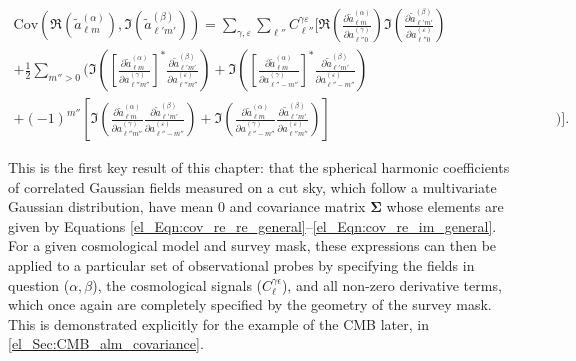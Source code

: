 \begin{equation}
\begin{split}
\mathrm{Cov} \left(
\Re \left( \widetilde{a}_{\ell m}^{ \left( \alpha \right) } \right),
\Im \left( \widetilde{a}_{\ell' m'}^{ \left( \beta \right) } \right)
\right) =
\sum_{\gamma, \varepsilon}
\sum_{\ell''}
C_{\ell''}^{\gamma \varepsilon}
\Bigg[
\Re \left(
\frac{\partial \widetilde{a}_{\ell m}^{ \left( \alpha \right) }}
{\partial a_{\ell'' 0}^{ \left( \gamma \right) }}
\right)
\Im \left(
\frac{\partial \widetilde{a}_{\ell' m'}^{ \left( \beta \right) }}
{\partial a_{\ell'' 0}^{ \left( \varepsilon \right) }}
\right)
\qquad\qquad\qquad\quad & \\
+
\frac{1}{2}
\sum_{m'' > 0} \Bigg(
\Im \left(
\left[
\frac{\partial \widetilde{a}_{\ell m}^{ \left( \alpha \right) }}
{\partial a_{\ell'' m''}^{ \left( \gamma \right) }}
\right]^*
\frac{\partial \widetilde{a}_{\ell' m'}^{ \left( \beta \right) }}
{\partial a_{\ell'' m''}^{ \left( \varepsilon \right) }}
\right)
+ \Im \left(
\left[
\frac{\partial \widetilde{a}_{\ell m}^{ \left( \alpha \right) }}
{\partial a_{\ell'' -m''}^{ \left( \gamma \right) }}
\right]^*
\frac{\partial \widetilde{a}_{\ell' m'}^{ \left( \beta \right) }}
{\partial a_{\ell'' -m''}^{ \left( \varepsilon \right) }}
\right) & \\
+
\left( -1 \right)^{m''} \left[
\Im \left(
\frac{\partial \widetilde{a}_{\ell m}^{ \left( \alpha \right) }}
{\partial a_{\ell'' m''}^{ \left( \gamma \right) }}
\frac{\partial \widetilde{a}_{\ell' m'}^{ \left( \beta \right) }}
{\partial a_{\ell'' -m''}^{ \left( \varepsilon \right) }}
\right)
+ \Im \left(
\frac{\partial \widetilde{a}_{\ell m}^{ \left( \alpha \right) }}
{\partial a_{\ell'' -m''}^{ \left( \gamma \right) }}
\frac{\partial \widetilde{a}_{\ell' m'}^{ \left( \beta \right) }}
{\partial a_{\ell'' m''}^{ \left( \varepsilon \right) }}
\right) \right] &
\Bigg) \Bigg].
\label{el_Eqn:cov_re_im_general}
\end{split}
\end{equation}

This is the first key result of this chapter: that the spherical harmonic coefficients of correlated Gaussian fields measured on a cut sky, which follow a multivariate Gaussian distribution, have mean $\mathbfit{0}$ and covariance matrix $\bm{\Sigma}$ whose elements are given by Equations \eqref{el_Eqn:cov_re_re_general}--\eqref{el_Eqn:cov_re_im_general}. For a given cosmological model and survey mask, these expressions can then be applied to a particular set of observational probes by specifying the fields in question ($\alpha, \beta$), the cosmological signals ($C_\ell^{\gamma\epsilon}$), and all non-zero derivative terms, which once again are completely specified by the geometry of the survey mask. This is demonstrated explicitly for the example of the CMB later, in \autoref{el_Sec:CMB_alm_covariance}.

